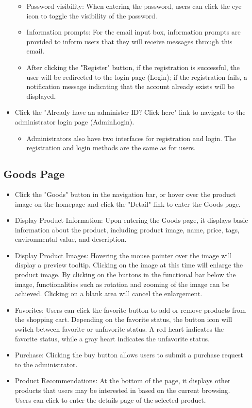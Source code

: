 \documentclass{article}
\begin{document}
\begin{itemize}
\begin{itemize}
        \item Password visibility: When entering the password, users can click the eye icon to toggle the visibility of the password.
        \item Information prompts: For the email input box, information prompts are provided to inform users that they will receive messages through this email.
        \item After clicking the "Register" button, if the registration is successful, the user will be redirected to the login page (Login); if the registration fails, a notification message indicating that the account already exists will be displayed.
    \end{itemize}
    \item Click the "Already have an administer ID? Click here" link to navigate to the administrator login page (AdminLogin).
    \begin{itemize}
        \item Administrators also have two interfaces for registration and login. The registration and login methods are the same as for users.
    \end{itemize}
\end{itemize}

\subsection{Goods Page}
\begin{itemize}
    \item Click the "Goods" button in the navigation bar, or hover over the product image on the homepage and click the "Detail" link to enter the Goods page.
    \item Display Product Information: Upon entering the Goods page, it displays basic information about the product, including product image, name, price, tags, environmental value, and description.
    \item Display Product Images: Hovering the mouse pointer over the image will display a preview tooltip. Clicking on the image at this time will enlarge the product image. By clicking on the buttons in the functional bar below the image, functionalities such as rotation and zooming of the image can be achieved. Clicking on a blank area will cancel the enlargement.
    \item Favorites: Users can click the favorite button to add or remove products from the shopping cart. Depending on the favorite status, the button icon will switch between favorite or unfavorite status. A red heart indicates the favorite status, while a gray heart indicates the unfavorite status.
    \item Purchase: Clicking the buy button allows users to submit a purchase request to the administrator.
    \item Product Recommendations: At the bottom of the page, it displays other products that users may be interested in based on the current browsing. Users can click to enter the details page of the selected product.
\end{itemize}
\end{document}
